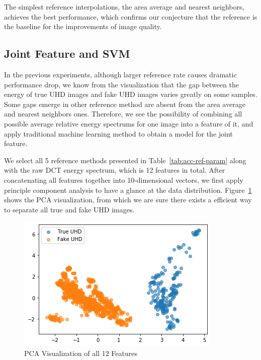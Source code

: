 \documentclass[journal,conference]{IEEEtran}
\begin{document}
The simplest reference interpolations, the area average and nearest neighbors, achieves the best performance, which confirms our conjecture that the reference is the baseline for the improvements of image quality.

\subsection{Joint Feature and SVM}
In the previous experiments, although larger reference rate causes dramatic performance drop, we know from the visualization that the gap between the energy of true UHD images and fake UHD images varies greatly on some samples.
Some gaps emerge in other reference method are absent from the area average and nearest neighbors ones.
Therefore, we see the possibility of combining all possible average relative energy spectrums for one image into a feature of it, and apply traditional machine learning method to obtain a model for the joint feature.

We select all 5 reference methods presented in Table~\ref{tab:acc-ref-param} along with the raw DCT energy spectrum, which is 12 features in total.
After concatenating all features together into 10-dimensional vectors, we first apply principle component analysis to have a glance at the data distribution.
Figure~\ref{fig:pca} shows the PCA visualization, from which we are sure there exists a efficient way to separate all true and fake UHD images.

\begin{figure}[h]
	\centering
	\includegraphics[width=0.95\linewidth]{fig/pca.png}
	\caption{PCA Visualization of all 12 Features}
	\label{fig:pca}
\end{figure}
\end{document}
